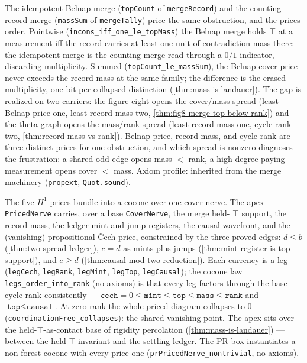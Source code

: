 \begin{theorem}\label{thm:two-spread-ledger}\leanok{}
The idempotent Belnap merge (\texttt{topCount} of \texttt{mergeRecord}) and the
counting record merge (\texttt{massSum} of \texttt{mergeTally}) price the same
obstruction, and the prices order. Pointwise
(\texttt{incons\_iff\_one\_le\_topMass}) the Belnap merge holds \(\top\) at a
measurement iff the record carries at least one unit of contradiction mass
there: the idempotent merge is the counting merge read through a \(0/1\)
indicator, discarding multiplicity. Summed
(\texttt{topCount\_le\_massSum}), the Belnap cover price never exceeds the
record mass at the same family; the difference is the erased multiplicity, one
bit per collapsed distinction (\cref{thm:mass-is-landauer}). The gap is
realized on two carriers: the figure-eight opens the cover/mass spread (least
Belnap price one, least record mass two,
\cref{thm:fig8-merge-top-below-rank}) and the theta graph opens the mass/rank
spread (least record mass one, cycle rank two,
\cref{thm:record-mass-vs-rank}). Belnap price, record mass, and cycle rank are
three distinct prices for one obstruction, and which spread is nonzero
diagnoses the frustration: a shared odd edge opens mass \(<\) rank, a
high-degree paying measurement opens cover \(<\) mass. Axiom profile: inherited
from the merge machinery (\texttt{propext}, \texttt{Quot.sound}).
\end{theorem}

\begin{theorem}\label{thm:currency-cocone}\leanok{}
The five \(H^1\) prices bundle into a cocone over one cover nerve. The apex
\texttt{PricedNerve} carries, over a base \texttt{CoverNerve}, the merge held-
\(\top\) support, the record mass, the ledger mint and jump registers, the causal
wavefront, and the (vanishing) propositional \v{C}ech price, constrained by the
three proved edges: \(d \le b\) (\cref{thm:two-spread-ledger}), \(c = d\) as
mints plus jumps (\cref{thm:mint-register-is-top-support}), and \(e \ge d\)
(\cref{thm:causal-mod-two-reduction}). Each currency is a leg
(\texttt{legCech}, \texttt{legRank}, \texttt{legMint}, \texttt{legTop},
\texttt{legCausal}); the cocone law \texttt{legs\_order\_into\_rank} (no axioms) is
that every leg factors through the base cycle rank consistently ---
\(\texttt{cech} = 0 \le \texttt{mint} \le \texttt{top} \le \texttt{mass} \le
\texttt{rank}\) and \(\texttt{top} \le \texttt{causal}\). At zero rank the whole
priced diagram collapses to \(0\) (\texttt{coordinationFree\_collapses}): the
shared vanishing point. The apex sits over the held-\(\top\)-as-contact base of
rigidity percolation (\cref{thm:mass-is-landauer}) --- between the held-\(\top\)
invariant and the settling ledger. The PR box instantiates a non-forest cocone
with every price one (\texttt{prPricedNerve\_nontrivial}, no axioms).
\end{theorem}


